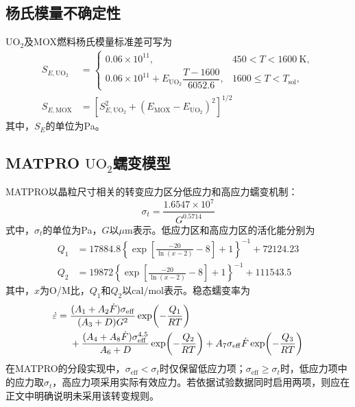 \subsection{杨氏模量不确定性}

$\mathrm{UO}_2$及MOX燃料杨氏模量标准差可写为
\begin{equation}
	\begin{aligned}
		S_{E,\mathrm{UO}_2}
		&=
		\begin{cases}
			0.06\times10^{11},
			&450<T<1600\ \mathrm{K},\\
			0.06\times10^{11}
			+E_{\mathrm{UO}_2}\dfrac{T-1600}{6052.6},
			&1600\leq T<T_{\mathrm{sol}},
		\end{cases}\\[0.5ex]
		S_{E,\mathrm{MOX}}
		&=
		\left[
		S_{E,\mathrm{UO}_2}^{2}
		+\left(E_{\mathrm{MOX}}-E_{\mathrm{UO}_2}\right)^2
		\right]^{1/2}
	\end{aligned}
	\label{eq:appendix_uo2_youngs_modulus_uncertainty}
\end{equation}
\label{eq:appendix_mox_youngs_modulus_uncertainty}
其中，$S_E$的单位为Pa。

\subsection{MATPRO $\mathrm{UO}_2$蠕变模型}

MATPRO以晶粒尺寸相关的转变应力区分低应力和高应力蠕变机制：
\begin{equation}
	\sigma_t=\frac{1.6547\times10^7}{G^{0.5714}}
	\label{eq:appendix_uo2_transition_stress}
\end{equation}
式中，$\sigma_t$的单位为Pa，$G$以$\mu\mathrm{m}$表示。低应力区和高应力区的活化能分别为
\begin{equation}
	\begin{aligned}
		Q_1&=17884.8
				\left\{
				\exp\!\left[\frac{-20}{\ln(x-2)}-8\right]+1
				\right\}^{-1}
				+72124.23
				\\
				Q_2&=19872
				\left\{
				\exp\!\left[\frac{-20}{\ln(x-2)}-8\right]+1
				\right\}^{-1}
				+111543.5
	\end{aligned}
	\label{eq:appendix_uo2_activation_energies}
\end{equation}
\label{eq:appendix_uo2_Q1}
\label{eq:appendix_uo2_Q2}
其中，$x$为O/M比，$Q_1$和$Q_2$以$\mathrm{cal/mol}$表示。稳态蠕变率为
\begin{align}
	\dot{\varepsilon}={}&
	\frac{(A_1+A_2\dot{F})\sigma_{\mathrm{eff}}}
	{(A_3+D)G^2}
	\exp\!\left(-\frac{Q_1}{RT}\right)
	\notag\\
	&+\frac{(A_4+A_8\dot{F})\sigma_{\mathrm{eff}}^{4.5}}
	{A_6+D}
	\exp\!\left(-\frac{Q_2}{RT}\right)
	+A_7\sigma_{\mathrm{eff}}\dot{F}
	\exp\!\left(-\frac{Q_3}{RT}\right)
	\label{eq:appendix_uo2_matpro_creep}
\end{align}
在MATPRO的分段实现中，$\sigma_{\mathrm{eff}}<\sigma_t$时仅保留低应力项；$\sigma_{\mathrm{eff}}\geq\sigma_t$时，低应力项中的应力取$\sigma_t$，高应力项采用实际有效应力。若依据试验数据同时启用两项，则应在正文中明确说明未采用该转变规则。

